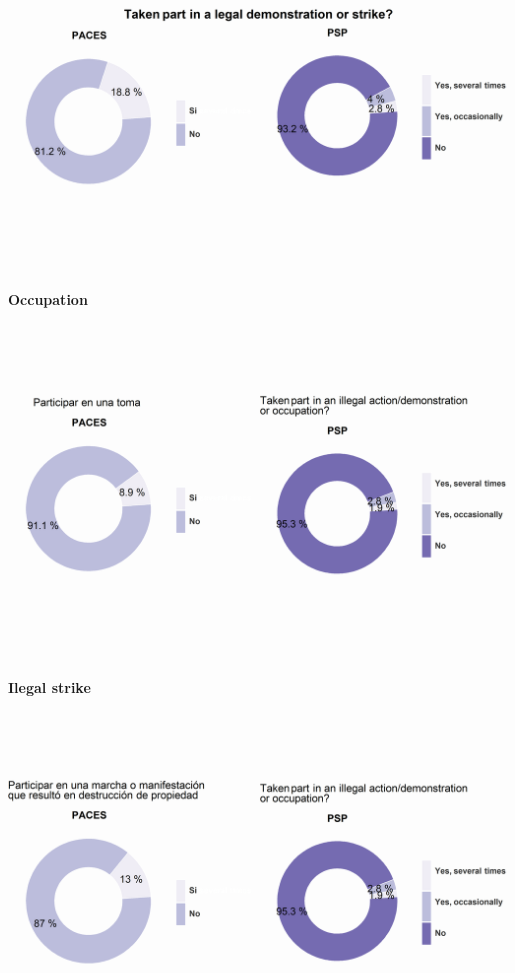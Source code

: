 \documentclass[12pt,twoside]{templates/facsothesis}
\begin{document}
\includegraphics{output/plotyp3.png}

\textbf{Occupation}

\includegraphics{output/plotyp4.png}

\textbf{Ilegal strike}

\includegraphics{output/plotyp5.png}
\end{document}
